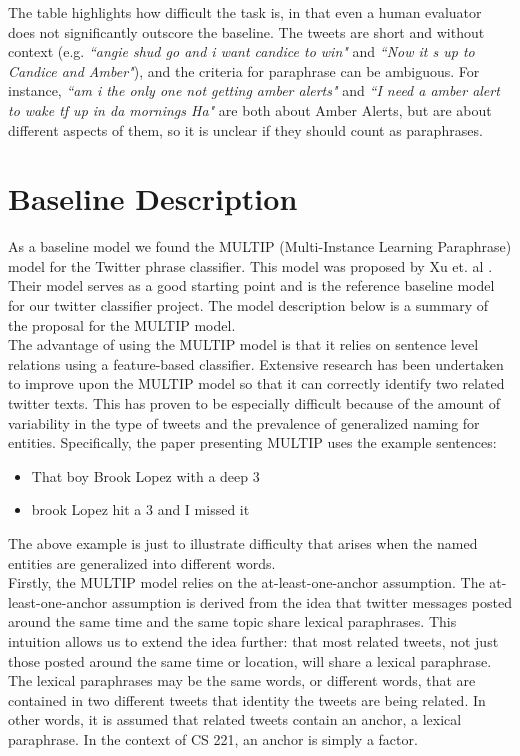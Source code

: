 \documentclass[conference]{IEEEtran}
\begin{document}
The table highlights how difficult the task is, in that even a human evaluator does not significantly outscore the baseline.  The tweets are short and without context (e.g. \emph{``angie shud go and i want candice to win"} and \textit{``Now it s up to Candice and Amber"}), and the criteria for paraphrase can be ambiguous.  For instance, \textit{``am i the only one not getting amber alerts"} and \emph{``I need a amber alert to wake tf up in da mornings Ha"} are both about Amber Alerts, but are about different aspects of them, so it is unclear if they should count as paraphrases.\\

\section{Baseline Description}
As a baseline model we found the MULTIP (Multi-Instance Learning Paraphrase) model for the Twitter phrase classifier. This model was proposed by Xu et. al \cite{zane}. Their model serves as a good starting point and is the reference baseline model for our twitter classifier project. The model description below is a summary of the proposal for the MULTIP model. \\

\indent The advantage of using the MULTIP model is that it relies on sentence level relations using a feature-based classifier. Extensive research has been undertaken to improve upon the MULTIP model so that it can correctly identify two related twitter texts. This has proven to be especially difficult because of the amount of variability in the type of tweets and the prevalence of generalized naming for entities. Specifically, the paper presenting MULTIP uses the example sentences:

\begin{itemize}
\item That boy Brook Lopez with a deep 3
\item brook Lopez hit a 3 and I missed it
\end{itemize}
The above example is just to illustrate difficulty that arises when the named entities are generalized into different words. \\

\indent Firstly, the MULTIP model relies on the at-least-one-anchor assumption. The at-least-one-anchor assumption is derived from the idea that twitter messages posted around the same time and the same topic share lexical paraphrases. This intuition allows us to extend the idea further: that most related tweets, not just those posted around the same time or location, will share a lexical paraphrase. The lexical paraphrases may be the same words, or different words, that are contained in two different tweets that identity the tweets are being related. In other words, it is assumed that related tweets contain an anchor, a lexical paraphrase. In the context of CS 221, an anchor is simply a factor. \\
\end{document}
